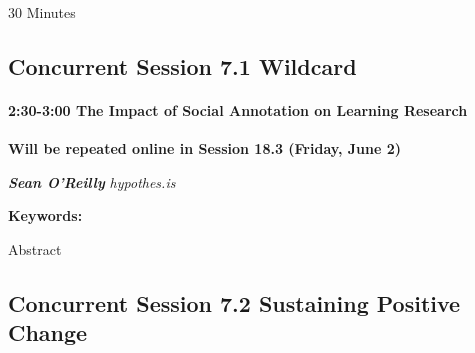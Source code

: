\documentclass[
]{book}
\begin{document}
30 Minutes

\hypertarget{concurrent-session-7.1-wildcard}{%
\subsection*{Concurrent Session 7.1 \textbar{} Wildcard}\label{concurrent-session-7.1-wildcard}}

\begin{vendor}
\hypertarget{the-impact-of-social-annotation-on-learning-research}{%
\paragraph*{\texorpdfstring{2:30-3:00 \textbar{} \textbf{The Impact of
Social Annotation on Learning} \textbar{}
Research}{2:30-3:00 \textbar{} The Impact of Social Annotation on Learning \textbar{} Research}}\label{the-impact-of-social-annotation-on-learning-research}}

\textbf{Will be repeated online in Session 18.3 (Friday, June 2)}

\textbf{\emph{Sean O'Reilly}} \textbar{} \emph{hypothes.is}

\textbf{Keywords:}

Abstract
\end{vendor}

\hypertarget{concurrent-session-7.2-sustaining-positive-change}{%
\subsection*{Concurrent Session 7.2 \textbar{} Sustaining Positive Change}\label{concurrent-session-7.2-sustaining-positive-change}}
\end{document}
